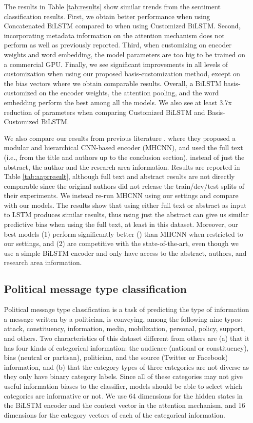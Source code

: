 \documentclass[11pt,a4paper]{article}
\begin{document}
The results in Table \ref{tab:results} show similar trends from the sentiment classification results. First, we obtain better performance when using Concatenated BiLSTM compared to when using Customized BiLSTM. Second, incorporating metadata information on the attention mechanism does not perform as well as previously reported. Third, when customizing on encoder weights and word embedding, the model parameters are too big to be trained on a commercial GPU. Finally, we see significant improvements in all levels of customization when using our proposed basis-customization method, except on the bias vectors where we obtain comparable results. 
Overall, a BiLSTM basis-customized on the encoder weights, the attention pooling, and the word embedding perform the best among all the models. We also see at least 3.7x reduction of parameters when comparing Customized BiLSTM and Basis-Customized BiLSTM.

We also compare our results from previous literature \cite{yang2018automatic}, where they proposed a modular and hierarchical CNN-based encoder (MHCNN), and
used the full text (i.e., from the title and authors up to the conclusion section), instead of just the abstract, the author and the research area information. Results are reported in Table \ref{tab:aaprresult}, although full text and abstract results are not directly comparable since the original authors did not release the train/dev/test splits of their experiments.
We instead re-run MHCNN using our settings and compare with our models.
The results show that using either full text or abstract as input to LSTM produces similar results, thus using just the abstract can give us similar predictive bias when using the full text, at least in this dataset. Moreover, our best models (1) perform significantly better () than MHCNN when restricted to our settings,
and (2) are competitive with the state-of-the-art, even though we use a simple BiLSTM encoder and only have access to the abstract, authors, and research area information.

\subsection{Political message type classification}

Political message type classification is a task of predicting the type of information a message written by a politician, is conveying, among the following nine types: attack, constituency, information, media, mobilization, personal, policy, support, and others. Two characteristics of this dataset different from others are (a) that it has four kinds of categorical information: the audience (national or constituency), bias (neutral or partisan), politician, and the source (Twitter or Facebook) information, and (b) that the category types of three categories are not diverse as they only have binary category labels. Since all of these categories may not give useful information biases to the classifier, models should be able to select which categories are informative or not. We use 64 dimensions for the hidden states in the BiLSTM encoder and the context vector in the attention mechanism, and 16 dimensions for the category vectors of each of the categorical information.
\end{document}
